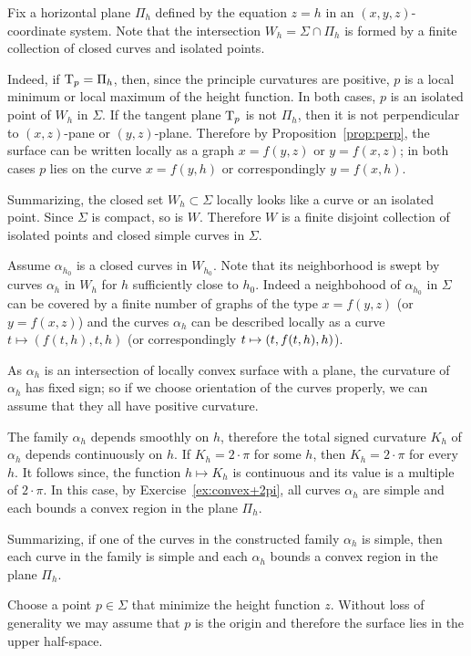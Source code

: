Fix a horizontal plane $\Pi_h$ defined by the equation $z=h$ in an $(x,y,z)$-coordinate system.
Note that the intersection $W_h=\Sigma\cap\Pi_h$ is formed by a finite collection of closed curves and isolated points.

Indeed, if $\mathrm{T}_p=\Pi_h$, then, since the principle curvatures are positive, $p$ is a local minimum or local maximum of the height function.
In both cases, $p$ is an isolated point of $W_h$ in $\Sigma$.
If the tangent plane $\mathrm{T}_p$ is not $\Pi_h$, then it is not perpendicular to $(x,z)$-pane or $(y,z)$-plane.
Therefore by Proposition~\ref{prop:perp}, the surface can be written locally as a graph $x=f(y,z)$ or $y=f(x,z)$;
in both cases $p$ lies on the curve $x=f(y,h)$ or correspondingly $y=f(x,h)$.

Summarizing, the closed set $W_h\subset \Sigma$ locally looks like a curve or an isolated point.
Since $\Sigma$ is compact, so is $W$.
Therefore $W$ is a finite disjoint collection of isolated points and closed simple curves in $\Sigma$.

Assume $\alpha_{h_0}$ is a closed curves in $W_{h_0}$.
Note that its neighborhood is swept by curves $\alpha_h$ in $W_{h}$ for $h$ sufficiently close to $h_0$.
Indeed a neighbohood of $\alpha_{h_0}$ in $\Sigma$ can be covered by a finite number of graphs of the type $x=f(y,z)$ (or $y=f(x,z)$) and the curves $\alpha_h$ can be described locally as a curve $t\mapsto (f(t,h),t,h)$ (or correspondingly $t\z\mapsto(t,f(t,h),h)$).

As $\alpha_h$ is an intersection of locally convex surface with a plane,
the curvature of $\alpha_h$ has fixed sign;
so if we choose orientation of the curves properly, we can assume that they all have positive curvature.

The family $\alpha_h$ depends smoothly on $h$,
therefore the total signed curvature $K_h$ of $\alpha_h$ depends continuously on $h$.
If $K_h=2\cdot\pi$ for some $h$, then $K_h=2\cdot\pi$ for every $h$.
It follows since, the function $h\mapsto K_h$ is continuous and its value is a multiple of $2\cdot\pi$.
In this case, by Exercise~\ref{ex:convex+2pi}, all curves $\alpha_h$ are simple and each bounds a convex region in the plane $\Pi_h$.

Summarizing, if one of the curves in the constructed family $\alpha_{h}$ is simple,
then each curve in the family is simple and each $\alpha_{h}$ bounds a convex region in the plane $\Pi_h$. 

Choose a point $p\in \Sigma$ that minimize the height function $z$.
Without loss of generality we may assume that $p$ is the origin and therefore the surface lies in the upper half-space.

